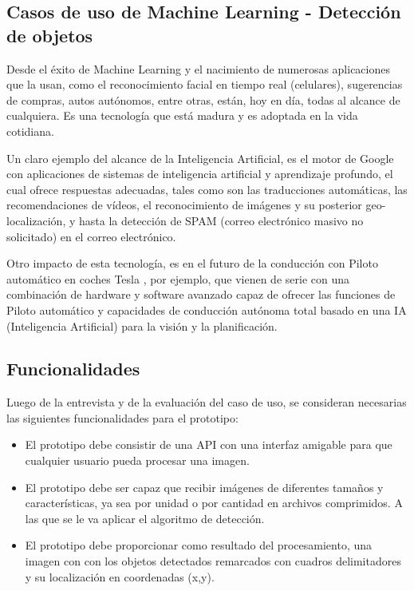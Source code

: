 \subsection{Casos de uso de Machine Learning - Detección de objetos}


Desde el éxito de Machine Learning y el nacimiento de numerosas aplicaciones que la usan, como el reconocimiento facial en tiempo real (celulares), sugerencias de compras, autos autónomos, entre otras, están, hoy en día, todas al alcance de cualquiera. Es una tecnología que está madura y es adoptada en la vida cotidiana.

Un claro ejemplo del alcance de la Inteligencia Artificial, es el motor de Google con aplicaciones de sistemas de inteligencia artificial y aprendizaje profundo, el cual ofrece respuestas adecuadas, tales como son las traducciones automáticas, las recomendaciones de vídeos, el reconocimiento de imágenes y su posterior geo-localización, y hasta la detección de SPAM (correo electrónico masivo no solicitado) en el correo electrónico.

Otro impacto de esta tecnología, es en el futuro de la conducción con Piloto automático en coches Tesla \cite{tesla}, por ejemplo, que vienen de serie con una combinación de hardware y software avanzado capaz de ofrecer las funciones de Piloto automático y capacidades de conducción autónoma total basado en una IA (Inteligencia Artificial) para la visión y la planificación.


\subsection{Funcionalidades}

Luego de la entrevista y de la evaluación del caso de uso, se consideran necesarias las siguientes funcionalidades para el prototipo:
\begin{itemize}
    \item El prototipo debe consistir de una API con una interfaz amigable para que cualquier usuario pueda procesar una imagen.
    \item El prototipo debe ser capaz que recibir imágenes de diferentes tamaños y características, ya sea por unidad o por cantidad en archivos comprimidos. A las que se le va aplicar el algoritmo de detección.
    \item El prototipo debe proporcionar como resultado del procesamiento, una imagen con con los objetos detectados remarcados con cuadros delimitadores y su localización en coordenadas (x,y). 
\end{itemize}

